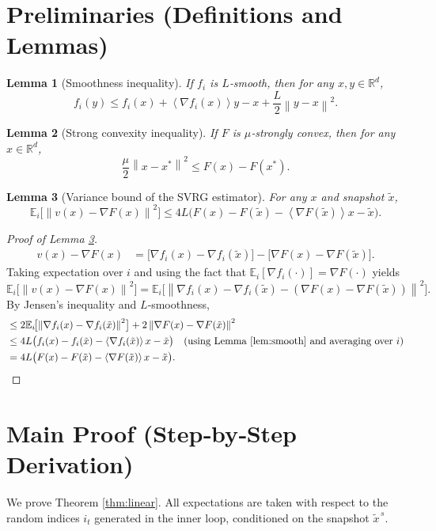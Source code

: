 \documentclass{article}
\newtheorem{lemma}{Lemma}
\newcommand{\E}{\mathbb{E}}
\newcommand{\R}{\mathbb{R}}
\newcommand{\norm}[1]{\left\|#1\right\|}
\newcommand{\inner}[1]{\left\langle #1 \right\rangle}
\begin{document}
\section*{Preliminaries (Definitions and Lemmas)}
\begin{lemma}[Smoothness inequality]\label{lem:smooth}
If $f_i$ is $L$‑smooth, then for any $x,y\in\R^{d}$,
\[
f_i(y)\le f_i(x)+\inner{\nabla f_i(x)}{y-x}
           +\frac{L}{2}\norm{y-x}^{2}.
\tag{L1}
\]
\end{lemma}
\begin{lemma}[Strong convexity inequality]\label{lem:strong}
If $F$ is $\mu$‑strongly convex, then for any $x\in\R^{d}$,
\[
\frac{\mu}{2}\norm{x-x^{*}}^{2}\le F(x)-F(x^{*}).
\tag{L2}
\]
\end{lemma}
\begin{lemma}[Variance bound of the SVRG estimator]\label{lem:var}
For any $x$ and snapshot $\tilde{x}$,
\[
\E_{i}\!\bigl[\norm{v(x)-\nabla F(x)}^{2}\bigr]
\le 4L\bigl(F(x)-F(\tilde{x})-\inner{\nabla F(\tilde{x})}{x-\tilde{x}}\bigr).
\tag{L3}
\]
\end{lemma}
\begin{proof}[Proof of Lemma \ref{lem:var}]
\begin{align*}
v(x)-\nabla F(x)&=
\bigl[\nabla f_i(x)-\nabla f_i(\tilde{x})\bigr]
 -\bigl[\nabla F(x)-\nabla F(\tilde{x})\bigr].
\end{align*}
Taking expectation over $i$ and using the fact that $\E_i[\nabla f_i(\cdot)]=\nabla F(\cdot)$ yields
\[
\E_i\!\bigl[\norm{v(x)-\nabla F(x)}^{2}\bigr]
 =\E_i\!\bigl[\norm{\nabla f_i(x)-\nabla f_i(\tilde{x})
                -(\nabla F(x)-\nabla F(\tilde{x}))}^{2}\bigr].
\]
By Jensen’s inequality and $L$‑smoothness,
\[
\begin{aligned}
&\le 2\E_i\!\bigl[\norm{\nabla f_i(x)-\nabla f_i(\tilde{x})}^{2}\bigr]
   +2\norm{\nabla F(x)-\nabla F(\tilde{x})}^{2}\\
&\le 4L\bigl(f_i(x)-f_i(\tilde{x})-\inner{\nabla f_i(\tilde{x})}{x-\tilde{x}}\bigr)
   \quad\text{(using Lemma \ref{lem:smooth} and averaging over $i$)}\\
&=4L\bigl(F(x)-F(\tilde{x})-\inner{\nabla F(\tilde{x})}{x-\tilde{x}}\bigr).
\end{aligned}
\]
\end{proof}

\section*{Main Proof (Step‑by‑Step Derivation)}
We prove Theorem \ref{thm:linear}.  
All expectations are taken with respect to the random indices $i_t$ generated in the inner loop, conditioned on the snapshot $\tilde{x}^{\,s}$.
\end{document}
